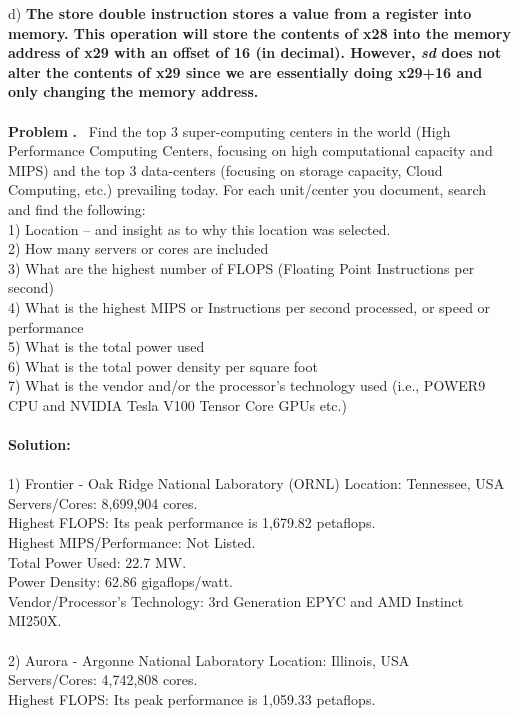 \documentclass[11pt]{article}
\newcounter{problem}
\newcounter{solution}
\newcommand\Problem{%
	\stepcounter{problem}%
	\textbf{\theproblem.}~%
	\setcounter{solution}{0}%
}
\newcommand\TheSolution{%
	\textbf{Solution:}\\%
}
\begin{document}
	d) \textbf{The store double instruction stores a value from a register into memory. This operation will store the contents of x28 into the memory address of x29 with an offset of 16 (in decimal). However, \textit{sd} does not alter the contents of x29 since we are essentially doing x29+16 and only changing the memory address.}
	\\
	\\
	\textbf{Problem} \Problem Find the top 3 super-computing centers in the world (High Performance Computing Centers, focusing on high computational capacity and MIPS) and the top 3 data-centers (focusing on storage capacity, Cloud Computing, etc.) prevailing today. For each unit/center you document, search and find the following:\\
	1) Location – and insight as to why this location was selected.\\
	2) How many servers or cores are included\\
	3) What are the highest number of FLOPS (Floating Point Instructions per second)\\
	4) What is the highest MIPS or Instructions per second processed, or speed or performance\\
	5) What is the total power used\\
	6) What is the total power density per square foot\\
	7) What is the vendor and/or the processor’s technology used (i.e., POWER9 CPU and NVIDIA Tesla V100 Tensor Core GPUs etc.)\\
\\
\TheSolution\\
1) Frontier - Oak Ridge National Laboratory (ORNL)
Location: Tennessee, USA \\
Servers/Cores: 8,699,904 cores.\\
Highest FLOPS: Its peak performance is 1,679.82 petaflops.\\
Highest MIPS/Performance: Not Listed.\\
Total Power Used:  22.7 MW.\\
Power Density: 62.86 gigaflops/watt.\\
Vendor/Processor's Technology: 3rd Generation EPYC and AMD Instinct MI250X.\\
\\
2) Aurora - Argonne National Laboratory
Location: Illinois, USA \\
Servers/Cores: 4,742,808 cores.\\
Highest FLOPS: Its peak performance is 1,059.33 petaflops.\\
\end{document}
